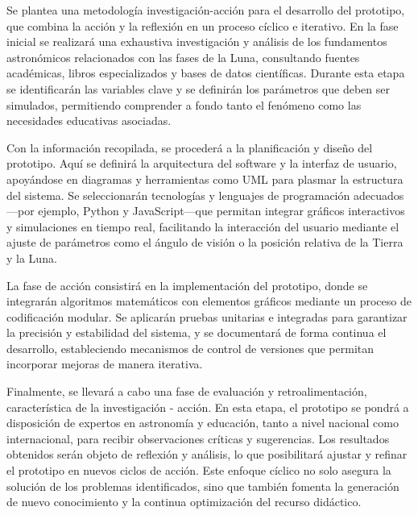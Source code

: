 Se plantea una metodología investigación-acción para el desarrollo del prototipo, que combina la acción y la reflexión en un proceso cíclico e iterativo. En la fase inicial se realizará una exhaustiva investigación y análisis de los fundamentos astronómicos relacionados con las fases de la Luna, consultando fuentes académicas, libros especializados y bases de datos científicas. Durante esta etapa se identificarán las variables clave y se definirán los parámetros que deben ser simulados, permitiendo comprender a fondo tanto el fenómeno como las necesidades educativas asociadas.

Con la información recopilada, se procederá a la planificación y diseño del prototipo. Aquí se definirá la arquitectura del software y la interfaz de usuario, apoyándose en diagramas y herramientas como UML para plasmar la estructura del sistema. Se seleccionarán tecnologías y lenguajes de programación adecuados—por ejemplo, Python y JavaScript—que permitan integrar gráficos interactivos y simulaciones en tiempo real, facilitando la interacción del usuario mediante el ajuste de parámetros como el ángulo de visión o la posición relativa de la Tierra y la Luna.

La fase de acción consistirá en la implementación del prototipo, donde se integrarán algoritmos matemáticos con elementos gráficos mediante un proceso de codificación modular. Se aplicarán pruebas unitarias e integradas para garantizar la precisión y estabilidad del sistema, y se documentará de forma continua el desarrollo, estableciendo mecanismos de control de versiones que permitan incorporar mejoras de manera iterativa.

Finalmente, se llevará a cabo una fase de evaluación y retroalimentación, característica de la investigación - acción. En esta etapa, el prototipo se pondrá a disposición de expertos en astronomía y educación, tanto a nivel nacional como internacional, para recibir observaciones críticas y sugerencias. Los resultados obtenidos serán objeto de reflexión y análisis, lo que posibilitará ajustar y refinar el prototipo en nuevos ciclos de acción. Este enfoque cíclico no solo asegura la solución de los problemas identificados, sino que también fomenta la generación de nuevo conocimiento y la continua optimización del recurso didáctico.
